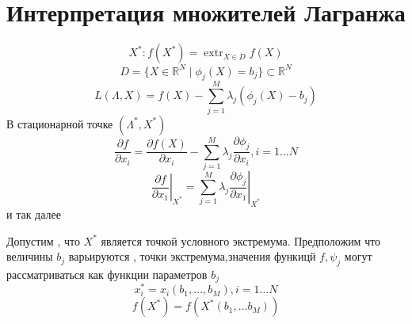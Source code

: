\documentclass[14pt]{extarticle}
\DeclareMathOperator{\extr}{extr}
\newcommand{\pa}[2]{ \frac{\partial #1}{\partial #2}}
\newcommand{\bm}[1]{ \left.#1\right|}
\begin{document}
  \section{Интерпретация множителей Лагранжа}
  \begin{equation}
  X^{*}: f(X^{*}) = \extr_{X \in D} f(X)
  \end{equation} 
  \begin{equation}
	  D = \{X \in \mathbb{R}^{N} \mid \phi_{j}(X) = b_{j}\} \subset \mathbb{R}^{N}
  \end{equation} 
  \begin{equation}
  L(\Lambda,X) =f(X) - \sum_{j = 1}^{M} \lambda_{j} (\phi_{j}(X) - b_{j})
  \end{equation} 
  В стационарной точке $(\Lambda^{*},X^{*})$
   \begin{equation}
   \pa{f}{x_{i}} = \pa{f(X)}{x_{i}} - \sum_{j =1}^{M}\lambda_{j} \pa{\phi_{j}}{x_{i}} ,i = 1 \dots N
   \end{equation} 
   \begin{equation}
	   \bm{\pa{f}{x_1}}_{X^{*}} = \sum_{j= 1}^{M} \lambda_{j} \bm{\pa{\phi_{j}}{x_{1}}}_{X^{*}}
   \end{equation} 
   и так далее

   Допустим , что $X^{*}$ 
   является точкой условного экстремума. Предположим
   что величины $b_{j}$ варьируются
   , точки экстремума,значения функицй $f,\psi_{j}$ могут рассматриваться как функции параметров
   $b_{j}$
    \begin{equation}
    	x^{*}_{i} =  x_i (b_1,\dots,b_{M}) , i = 1 \dots N
    \end{equation}
    \begin{equation}
    	f(X^{*}) = f(X^{*} (b_1, \dots b_{M}))
    \end{equation}
\end{document}
